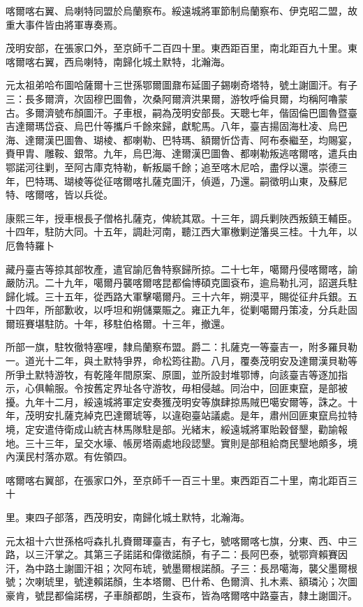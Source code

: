 \begin{pinyinscope}
喀爾喀右翼、烏喇特同盟於烏蘭察布。綏遠城將軍節制烏蘭察布、伊克昭二盟，故重大事件皆由將軍專奏焉。

茂明安部，在張家口外，至京師千二百四十里。東西距百里，南北距百九十里。東喀爾喀右翼，西烏喇特，南歸化城土默特，北瀚海。

元太祖弟哈布圖哈薩爾十三世孫鄂爾圖鼐布延圖子錫喇奇塔特，號土謝圖汗。有子三：長多爾濟，次固穆巴圖魯，次桑阿爾濟洪果爾，游牧呼倫貝爾，均稱阿嚕蒙古。多爾濟號布顏圖汗。子車根，嗣為茂明安部長。天聰七年，偕固倫巴圖魯暨臺吉達爾瑪岱袞、烏巴什等攜戶千餘來歸，獻駝馬。八年，臺吉揚固海杜凌、烏巴海、達爾漢巴圖魯、瑚棱、都喇勒、巴特瑪、額爾忻岱青、阿布泰繼至，均賜宴，賚甲胄、雕鞍、銀幣。九年，烏巴海、達爾漢巴圖魯、都喇勒叛逃喀爾喀，遣兵由鄂諾河往剿，至阿古庫克特勒，斬叛屬千餘；追至喀木尼哈，盡俘以還。崇德三年，巴特瑪、瑚棱等從征喀爾喀扎薩克圖汗，偵遁，乃還。嗣徵明山東，及蘇尼特、喀爾喀，皆以兵從。

康熙三年，授車根長子僧格扎薩克，俾統其眾。十三年，調兵剿陜西叛鎮王輔臣。十四年，駐防大同。十五年，調赴河南，聽江西大軍檄剿逆籓吳三桂。十九年，以厄魯特羅卜

藏丹臺吉等掠其部牧產，遣官諭厄魯特察歸所掠。二十七年，噶爾丹侵喀爾喀，諭嚴防汛。二十九年，噶爾丹襲喀爾喀昆都倫博碩克圖袞布，逾烏勒扎河，詔選兵駐歸化城。三十五年，從西路大軍擊噶爾丹。三十六年，朔漠平，賜從征弁兵銀。五十四年，所部歉收，以呼坦和朔儲粟賑之。雍正九年，從剿噶爾丹策凌，分兵赴固爾班賽堪駐防。十年，移駐伯格爾。十三年，撤還。

所部一旗，駐牧徹特塞哩，隸烏蘭察布盟。爵二：扎薩克一等臺吉一，附多羅貝勒一。道光十二年，與土默特爭界，命松筠往勘。八月，覆奏茂明安及達爾漢貝勒等所爭土默特游牧，有乾隆年間原案、原圖，並所設封堆鄂博，向該臺吉等逐加指示，心俱輸服。令按舊定界址各守游牧，毋相侵越。同治中，回匪東竄，是部被擾。九年十二月，綏遠城將軍定安奏獲茂明安等旗肆掠馬賊巴噶安爾等，誅之。十年，茂明安扎薩克綽克巴達爾琥等，以違砲臺站議處。是年，肅州回匪東竄烏拉特境，定安遣侍衛成山統吉林馬隊駐是部。光緒末，綏遠城將軍貽穀督墾，勸諭報地。三十三年，呈交水壕、帳房塔兩處地段認墾。實則是部租給商民墾地頗多，境內漢民村落亦眾。有佐領四。

喀爾喀右翼部，在張家口外，至京師千一百三十里。東西距百二十里，南北距百三十

里。東四子部落，西茂明安，南歸化城土默特，北瀚海。

元太祖十六世孫格哷森扎扎賚爾琿臺吉，有子七，號喀爾喀七旗，分東、西、中三路，以三汗掌之。其第三子諾諾和偉徵諾顏，有子二：長阿巴泰，號鄂齊賴賽因汗，為中路土謝圖汗祖；次阿布琥，號墨爾根諾顏。子三：長昂噶海，襲父墨爾根號；次喇琥里，號達賴諾顏，生本塔爾、巴什希、色爾濟、扎木素、額璘沁；次圖豪肯，號昆都倫諾楞，子車顏都朗，生袞布，皆為喀爾喀中路臺吉，隸土謝圖汗。


\end{pinyinscope}

